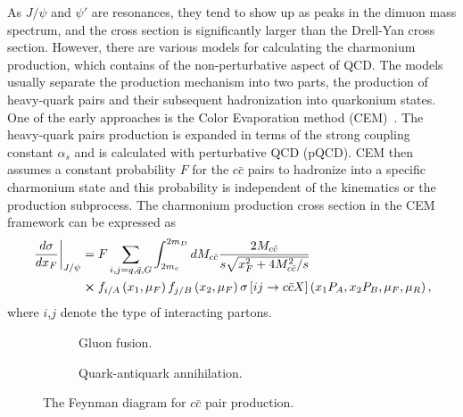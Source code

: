 \documentclass[../main.tex]{subfiles}
\begin{document}
As $J/\psi$ and $\psi'$ are resonances, they tend to show up as peaks in the dimuon mass spectrum,
and the cross section is significantly larger than the Drell-Yan cross section.
However, there are various models for calculating the charmonium production,
which contains of the non-perturbative aspect of QCD.
The models usually separate the production
mechanism into two parts, the production of heavy-quark pairs and their subsequent
hadronization into quarkonium states. One of the early approaches is the Color
Evaporation method (CEM)~\cite{einhorn1975,bodwin1995}. The heavy-quark
pairs production is expanded in terms of the strong coupling constant $\alpha_s$
and is calculated with perturbative QCD (pQCD). CEM then assumes a constant
probability $F$ for the $c\bar{c}$ pairs to hadronize into a specific charmonium
state and this probability is independent of the kinematics or the production
subprocess. The charmonium production cross section in the CEM framework can be
expressed as
\begin{equation}
	\begin{split}
		\left.\frac{d\sigma}{dx_F}\right|_{J/\psi} & = F \sum_{i,j = q,\bar{q},G}\int^{2m_D}_{2m_c} dM_{c\bar{c}}  \frac{2M_{c\bar{c}}}{s\sqrt{x_F^2+4M_{c\bar{c}}^2/s}}                                 \\
		                                           & \cross f_{i/A}\left(x_1,\mu_F\right)f_{j/B}\left(x_2,\mu_F\right)\sigma\left[ij\rightarrow c\bar{c}X\right]\left(x_1P_A,x_2P_B,\mu_F,\mu_R \right),
	\end{split}
\end{equation}
where $i$,$j$ denote the type of interacting partons.
\begin{figure}[htpb!]
	\centering
	\begin{subfigure}[c]{0.4\linewidth}
		\begin{subfigure}[c]{\linewidth}
			
		\end{subfigure}
		\begin{subfigure}[c]{\linewidth}
			
		\end{subfigure}
		\caption{Gluon fusion\label{subfig:gluon}.}
	\end{subfigure}
	\quad
	\begin{subfigure}[c]{0.4\linewidth}
		
		\caption{Quark-antiquark annihilation.\label{subfig:qqbar}}
	\end{subfigure}
	\caption{The Feynman diagram for $c\bar{c}$ pair production.}
	\label{fig:charmonium}
\end{figure}
\end{document}
